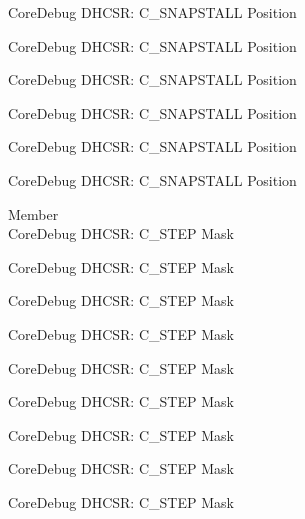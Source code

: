 \begin{DoxyRefList}
\label{deprecated__deprecated000690}%
%
Core\+Debug DHCSR\+: C\+\_\+\+SNAPSTALL Position 

\label{deprecated__deprecated000834}%
%
Core\+Debug DHCSR\+: C\+\_\+\+SNAPSTALL Position 

\label{deprecated__deprecated000976}%
%
Core\+Debug DHCSR\+: C\+\_\+\+SNAPSTALL Position 

\label{deprecated__deprecated001052}%
%
Core\+Debug DHCSR\+: C\+\_\+\+SNAPSTALL Position 

\label{deprecated__deprecated001141}%
%
Core\+Debug DHCSR\+: C\+\_\+\+SNAPSTALL Position 

\label{deprecated__deprecated001243}%
%
Core\+Debug DHCSR\+: C\+\_\+\+SNAPSTALL Position  
\item[Member \doxylink{group___c_m_s_i_s___core_debug_gae6bda72fbd32cc5734ff3542170dc00d}{Core\+Debug\+\_\+\+DHCSR\+\_\+\+C\+\_\+\+STEP\+\_\+\+Msk} ]\hfill \\
\label{deprecated__deprecated000036}%
%
Core\+Debug DHCSR\+: C\+\_\+\+STEP Mask 

\label{deprecated__deprecated000124}%
%
Core\+Debug DHCSR\+: C\+\_\+\+STEP Mask 

\label{deprecated__deprecated000180}%
%
Core\+Debug DHCSR\+: C\+\_\+\+STEP Mask 

\label{deprecated__deprecated000263}%
%
Core\+Debug DHCSR\+: C\+\_\+\+STEP Mask 

\label{deprecated__deprecated000322}%
%
Core\+Debug DHCSR\+: C\+\_\+\+STEP Mask 

\label{deprecated__deprecated000398}%
%
Core\+Debug DHCSR\+: C\+\_\+\+STEP Mask 

\label{deprecated__deprecated000487}%
%
Core\+Debug DHCSR\+: C\+\_\+\+STEP Mask 

\label{deprecated__deprecated000589}%
%
Core\+Debug DHCSR\+: C\+\_\+\+STEP Mask 

\label{deprecated__deprecated000695}%
%
Core\+Debug DHCSR\+: C\+\_\+\+STEP Mask 


\end{DoxyRefList}
